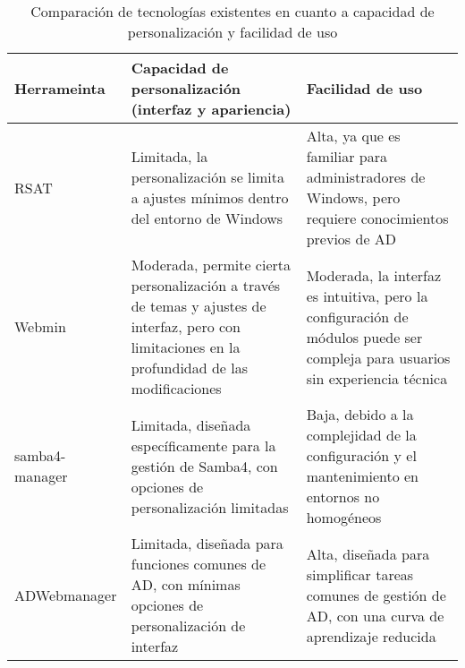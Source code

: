 \begin{longtable}{|l|p{5cm}|p{5cm}|}
    \caption{Comparación de tecnologías existentes en cuanto a capacidad de personalización y facilidad de uso
    }
    \label{table:ad-tech-comparison}                                                                                                                                                                                                                                                                       \\
    \hline
    \textbf{Herrameinta} & \textbf{Capacidad de personalización (interfaz y apariencia)}                                                                                   & \textbf{Facilidad de uso}                                                                                                     \\
    \hline
    \endfirsthead
    \hline
    RSAT                 & Limitada, la personalización se limita a ajustes mínimos dentro del entorno de Windows                                                          & Alta, ya que es familiar para administradores de Windows, pero requiere conocimientos previos de AD                           \\
    \hline
    Webmin               & Moderada, permite cierta personalización a través de temas y ajustes de interfaz, pero con limitaciones en la profundidad de las modificaciones & Moderada, la interfaz es intuitiva, pero la configuración de módulos puede ser compleja para usuarios sin experiencia técnica \\
    \hline
    samba4-manager       & Limitada, diseñada específicamente para la gestión de Samba4, con opciones de personalización limitadas                                         & Baja, debido a la complejidad de la configuración y el mantenimiento en entornos no homogéneos                                \\
    \hline
    ADWebmanager         & Limitada, diseñada para funciones comunes de AD, con mínimas opciones de personalización de interfaz                                            & Alta, diseñada para simplificar tareas comunes de gestión de AD, con una curva de aprendizaje reducida                        \\
    \hline
\end{longtable}
